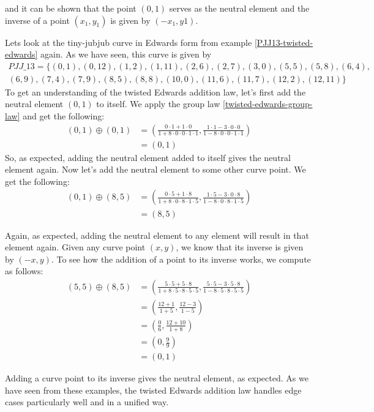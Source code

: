 and it can be shown that the point $(0,1)$ serves as the neutral element and the inverse of a point $(x_1, y_1)$ is given by $(-x_1, y1)$.
\begin{example} Lets look at the tiny-jubjub curve in Edwards form from example \ref{PJJ13-twisted-edwards} again. As we have seen, this curve is given by
\begin{multline*}
\mathit{PJJ\_13} = \{(0, 1),(0, 12),(1, 2),(1, 11),(2, 6),(2, 7),(3, 0),(5, 5),(5, 8),(6, 4),\\
(6, 9),(7, 4),(7, 9),(8, 5),(8, 8),(10, 0),(11, 6),(11, 7),(12, 2),(12, 11)\}
\end{multline*}
To get an understanding of the twisted Edwards addition law, let's first add the neutral element $(0,1)$ to itself. We apply the group law \ref{twisted-edwards-group-law} and get the following:
\begin{align*}
(0, 1) \oplus (0, 1) &= \left(\frac{0\cdot 1+1 \cdot 0}{1 +8\cdot0\cdot 0\cdot 1\cdot 1},\frac{1\cdot 1-3\cdot 0\cdot 0}{1-8\cdot 0\cdot 0\cdot 1\cdot 1}\right)\\
                     & = (0,1)
\end{align*}
So, as expected, adding the neutral element added to itself gives the neutral element again. Now let's add the neutral element to some other curve point. We get the following:
\begin{align*}
(0, 1) \oplus (8, 5) &= \left(\frac{0\cdot 5+1 \cdot 8}{1 +8\cdot0\cdot 8\cdot 1\cdot 5},\frac{1\cdot 5 - 3\cdot 0\cdot 8}{1-8\cdot 0\cdot 8\cdot 1\cdot 5}\right)\\
                     & = (8,5)
\end{align*}

Again, as expected, adding the neutral element to any element will result in that element again. Given any curve point $(x,y)$, we know that its inverse is given by $(-x,y)$. To see how the addition of a point to its inverse works, we compute as follows:
\begin{align*}
(5, 5) \oplus (8, 5) &= \left(\frac{5\cdot 5+5 \cdot 8}{1 +8\cdot 5\cdot 8\cdot 5\cdot 5},\frac{5\cdot 5 - 3\cdot 5\cdot 8}{1-8\cdot 5\cdot 8\cdot 5\cdot 5}\right)\\
                     &= \left(\frac{12+1}{1 +5},\frac{12 - 3}{1-5}\right)\\
                     &= \left(\frac{0}{6},\frac{12 + 10}{1+8}\right)\\
                     &= \left(0,\frac{9}{9}\right)\\
                     &=  (0,1)
\end{align*}

Adding a curve point to its inverse gives the neutral element, as expected. As we have seen from these examples, the twisted Edwards addition law handles edge cases particularly well and in a unified way.
\end{example}

